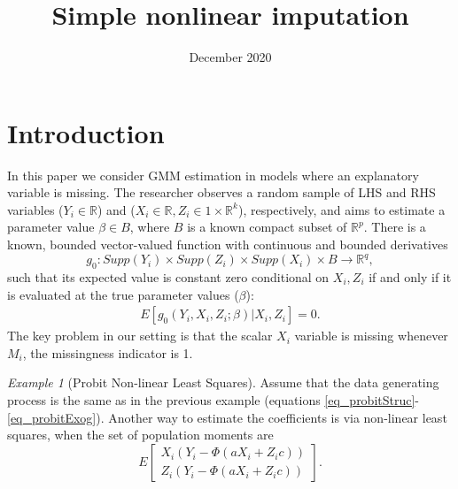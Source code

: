 \documentclass{article}
\title{Simple nonlinear imputation}
\author{}
\date{December 2020}
\theoremstyle{definition}
\theoremstyle{remark}
\newtheorem{example}{Example}
\begin{document}
\maketitle

\onehalfspacing


\section{Introduction}
In this paper we consider GMM estimation in models where an explanatory variable is missing. The researcher observes a random sample of LHS and RHS variables ($Y_i \in \mathbb{R}$) and ($X_i \in \mathbb{R},Z_i \in {1} \times \mathbb{R}^k$), respectively, and aims to estimate a parameter value $\beta \in B$, where $B$ is a known compact subset of $\mathbb{R}^p$. There is a known, bounded vector-valued function with continuous and bounded derivatives
\[g_0: Supp(Y_i) \times Supp(Z_i) \times Supp(X_i) \times B \rightarrow \mathbb{R}^q,
\]
such that its expected value is constant zero conditional on $X_i, Z_i$ if and only if it is evaluated at the true parameter values ($\beta$):
\begin{align}
E[g_0(Y_i, X_i, Z_i;\beta)|X_i,Z_i] = 0.
\end{align}
The key problem in our setting is that the scalar $X_i$ variable is missing whenever $M_i$, the missingness indicator is 1.

\begin{example}[Probit Non-linear Least Squares]
	Assume that the data generating process is the same as in the previous example (equations \eqref{eq_probitStruc}-\eqref{eq_probitExog}). Another way to estimate the coefficients is via non-linear least squares, when the set of population moments are
	\[E\left[\begin{array}{c}
	X_i(Y_i-\Phi(aX_i+Z_ic))\\
	Z_i(Y_i-\Phi(aX_i+Z_ic))
	\end{array}
	\right].
	\]
\end{example}
\end{document}
